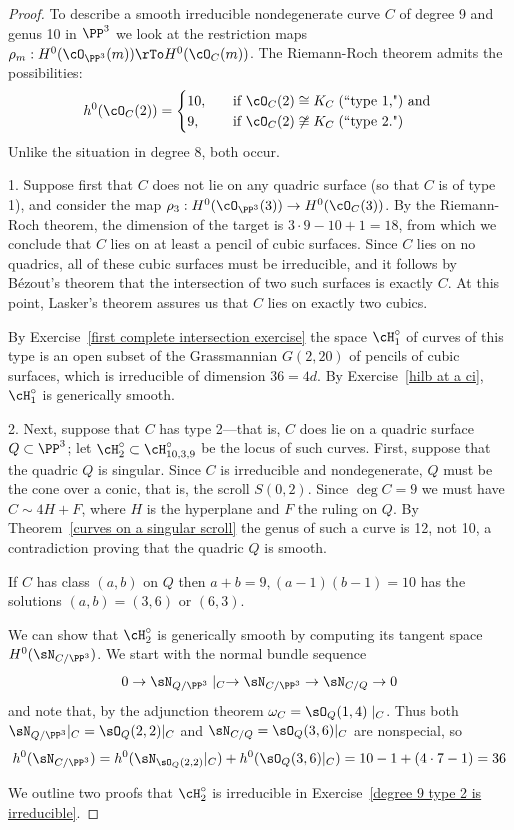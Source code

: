 \begin{proof}
To describe a smooth irreducible nondegenerate curve $C$ of degree 9 and genus 10 in $\PP^{3}$  we look at the restriction maps $\rho_m: H^0(\cO_{\PP^3}(m)) \rTo H^0(\cO_C(m))$. The Riemann-Roch theorem admits the possibilities:
\begin{align*}
h^0(\cO_C(2)) =
\begin{cases}
10, \quad &\text{if } \cO_C(2) \cong K_C \; \text{(``type 1,") and } \\
9,  \quad &\text{if } \cO_C(2) \not\cong K_C  \; \text{(``type 2.")}
\end{cases}
\end{align*}
Unlike the situation in degree 8, both occur.

1. Suppose first that $C$ does not lie on any quadric surface (so that $C$ is of type 1), and consider the map $\rho_3 : H^0(\cO_{\PP^3}(3)) \to H^0(\cO_C(3))$. By the Riemann-Roch theorem, the dimension of the target is $3\cdot 9 - 10 + 1 = 18$, from which we conclude that $C$ lies on at least a pencil of cubic surfaces. Since $C$ lies on no quadrics, all of these cubic surfaces must be irreducible, and it follows by B\'ezout's theorem that the intersection of two such surfaces is exactly $C$. At this point, Lasker's theorem assures us that $C$ lies on exactly two cubics.

By Exercise~\ref{first complete intersection exercise} the space $\cH^\circ_1$ of curves of this type is an open subset of the Grassmannian $G(2,20)$ of pencils of cubic surfaces, which is irreducible of dimension $36 = 4d$. By Exercise~\ref{hilb at a ci}, $\cH^\circ_1$ is generically smooth.

2. Next, suppose that $C$ has type 2---that is, $C$ does lie on a quadric surface $Q \subset \PP^3$; let $\cH^\circ_2 \subset \cH^\circ_{10,3,9}$ be the locus of such curves. First, suppose that the quadric $Q$ is singular. Since $C$ is irreducible and nondegenerate,
$Q$ must be the cone over a conic, that is, the scroll $S(0,2)$. Since $\deg C = 9$ we must have 
$C\sim 4H+F$, where $H$ is the hyperplane and $F$ the ruling on $Q$. By Theorem~\ref{curves on a singular scroll}
the genus of such a curve is 12, not 10, a contradiction proving that the quadric $Q$ is smooth.

If $C$ has class $(a,b)$ on $Q$ then $a+b= 9, (a-1)(b-1) = 10$ has the solutions $(a,b) = (3,6)$ or $(6,3)$.

We can show that $\cH^\circ_2$ is generically smooth by computing its tangent space
$H^0(\sN_{C/\PP^3})$. We start with the normal bundle sequence
$$
0\to \sN_{Q/\PP^3}\mid_C \to \sN_{C/\PP^3} \to \sN_{C/Q} \to 0
$$
and note that, by the adjunction theorem $\omega_C = \sO_Q(1,4)\mid_C$.
Thus both $\sN_{Q/\PP^3}|_C = \sO_Q(2,2)|_C$ and
$\sN_{C/Q} = \sO_Q(3,6)|_C$ are nonspecial, so 
$$
h^0 (\sN_{C/\PP^3}) = h^0(\sN_{\sO_Q(2,2)}|_C ) + h^0(\sO_Q(3,6)|_C)
= 10-1 + (4\cdot 7-1) = 36
$$

We outline two proofs that 
$\cH^\circ_2$ is irreducible in Exercise~\ref{degree 9 type 2 is irreducible}.
\end{proof}

